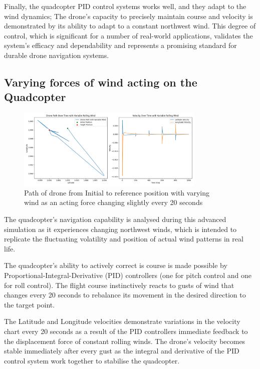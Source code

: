 \documentclass{report}
\begin{document}
Finally, the quadcopter PID control systems works well, and they adapt to the
wind dynamics; The drone's capacity to precisely maintain course and velocity is
demonstrated by its ability to adapt to a constant northwest wind. This degree
of control, which is significant for a number of real-world applications,
validates the system's efficacy and dependability and represents a promising
standard for durable drone navigation systems.


\subsection*{Varying forces of wind acting on the Quadcopter}
\begin{figure}[H]
  \centering
  \includegraphics[width=0.8\textwidth]{Pictures/Drone_path_wind_varys.png} 
  \captionsetup{justification=centering}
  \caption{Path of drone from Initial to reference position with varying\\ wind as an acting force changing slightly every 20 seconds}
  \label{fig:Drone_path_wind_varys}
\end{figure}
The quadcopter’s navigation capability is analysed during this advanced
simulation as it experiences changing northwest winds, which is intended to
replicate the fluctuating volatility and position of actual wind patterns in
real life. 

The quadcopter’s ability to actively correct is course is made possible by
Proportional-Integral-Derivative (PID) controllers (one for pitch control and
one for roll control). The flight course instinctively reacts to gusts of wind
that changes every 20 seconds to rebalance its movement in the desired direction
to the target point. 

The Latitude and Longitude velocities demonstrate variations in the velocity
chart every 20 seconds as a result of the  PID controllers immediate feedback to
the displacement force of constant rolling winds. The drone’s velocity becomes
stable immediately after every gust as the integral and derivative of the PID
control system work together to stabilise the quadcopter.
\end{document}
